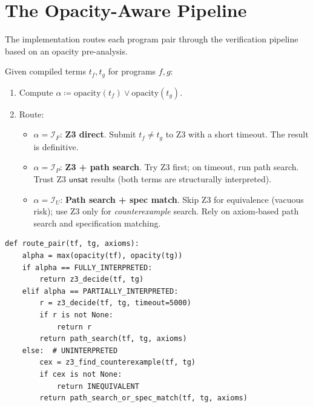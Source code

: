 \section{The Opacity-Aware Pipeline}
\label{sec:pipeline}

The implementation routes each program pair through the verification
pipeline based on an opacity pre-analysis.

\begin{definition}
\label{def:pipeline-routing}
Given compiled terms $t_f, t_g$ for programs $f, g$:
\begin{enumerate}
  \item Compute $\alpha \coloneqq \mathrm{opacity}(t_f) \vee
    \mathrm{opacity}(t_g)$.
  \item Route:
    \begin{itemize}
      \item $\alpha = \mathcal{I}_F$: \textbf{Z3 direct}.  Submit
        $t_f \neq t_g$ to Z3 with a short timeout.
        The result is definitive.
      \item $\alpha = \mathcal{I}_P$: \textbf{Z3 + path search}.
        Try Z3 first; on timeout, run path search.
        Trust Z3 $\mathsf{unsat}$ results (both terms are
        structurally interpreted).
      \item $\alpha = \mathcal{I}_U$: \textbf{Path search +
        spec match}.  Skip Z3 for equivalence (vacuous risk);
        use Z3 only for \emph{counterexample} search.
        Rely on axiom-based path search and specification matching.
    \end{itemize}
\end{enumerate}
\end{definition}

\begin{lstlisting}[caption={Opacity-aware routing (pseudocode)}]
def route_pair(tf, tg, axioms):
    alpha = max(opacity(tf), opacity(tg))
    if alpha == FULLY_INTERPRETED:
        return z3_decide(tf, tg)
    elif alpha == PARTIALLY_INTERPRETED:
        r = z3_decide(tf, tg, timeout=5000)
        if r is not None:
            return r
        return path_search(tf, tg, axioms)
    else:  # UNINTERPRETED
        cex = z3_find_counterexample(tf, tg)
        if cex is not None:
            return INEQUIVALENT
        return path_search_or_spec_match(tf, tg, axioms)
\end{lstlisting}

